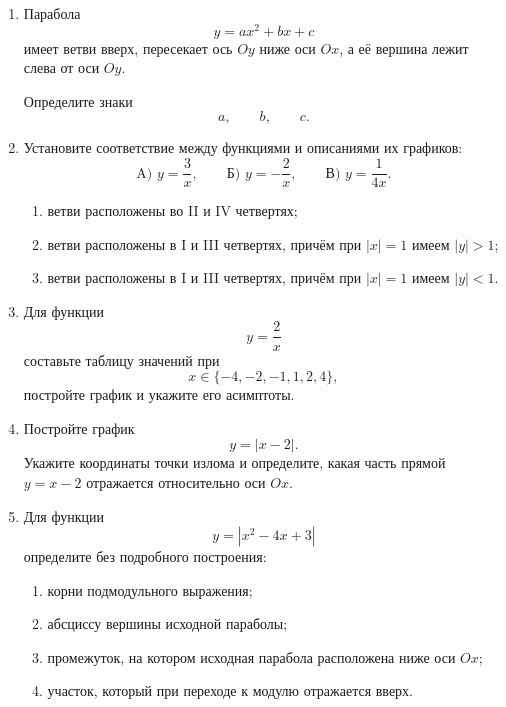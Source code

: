 \documentclass[a4paper,12pt]{article}
\begin{document}
\begin{enumerate}
  \item
  Парабола
  \[
    y=ax^2+bx+c
  \]
  имеет ветви вверх, пересекает ось $Oy$ ниже оси $Ox$,
  а её вершина лежит слева от оси $Oy$.

  Определите знаки
  \[
    a,\qquad b,\qquad c.
  \]

  \item
  Установите соответствие между функциями и описаниями их графиков:
  \[
    \text{A) } y=\frac{3}{x},
    \qquad
    \text{Б) } y=-\frac{2}{x},
    \qquad
    \text{В) } y=\frac{1}{4x}.
  \]

  \begin{enumerate}[label=\arabic*),itemsep=0.1em]
    \item ветви расположены во II и IV четвертях;
    \item ветви расположены в I и III четвертях, причём при $|x|=1$ имеем $|y|>1$;
    \item ветви расположены в I и III четвертях, причём при $|x|=1$ имеем $|y|<1$.
  \end{enumerate}

  \item
  Для функции
  \[
    y=\frac{2}{x}
  \]
  составьте таблицу значений при
  \[
    x\in\{-4,-2,-1,1,2,4\},
  \]
  постройте график и укажите его асимптоты.

  \item
  Постройте график
  \[
    y=|x-2|.
  \]
  Укажите координаты точки излома и определите,
  какая часть прямой $y=x-2$ отражается относительно оси $Ox$.

  \item
  Для функции
  \[
    y=|x^2-4x+3|
  \]
  определите без подробного построения:
  \begin{enumerate}[label=\alph*),itemsep=0.1em]
    \item корни подмодульного выражения;
    \item абсциссу вершины исходной параболы;
    \item промежуток, на котором исходная парабола расположена ниже оси $Ox$;
    \item участок, который при переходе к модулю отражается вверх.
  \end{enumerate}
\end{enumerate}
\endgroup


\clearpage
\end{document}
